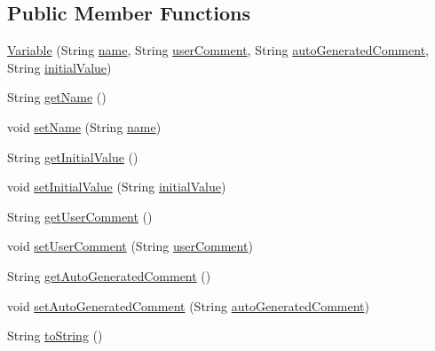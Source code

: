 \subsection*{Public Member Functions}
\begin{DoxyCompactItemize}
\item 
\hyperlink{classit_1_1isislab_1_1masonassisteddocumentation_1_1_o_d_d_1_1_variable_a9da139c1c60ec15079b4d66403f1baf9}{Variable} (String \hyperlink{classit_1_1isislab_1_1masonassisteddocumentation_1_1_o_d_d_1_1_variable_ac9b7d43d71c2021e449fa8013ba8254b}{name}, String \hyperlink{classit_1_1isislab_1_1masonassisteddocumentation_1_1_o_d_d_1_1_variable_a884cf9e8bd7fc7fca3391d3f4954e483}{user\-Comment}, String \hyperlink{classit_1_1isislab_1_1masonassisteddocumentation_1_1_o_d_d_1_1_variable_a8d4c06905b054fc8ece5f5af52dfdc24}{auto\-Generated\-Comment}, String \hyperlink{classit_1_1isislab_1_1masonassisteddocumentation_1_1_o_d_d_1_1_variable_a3113358fdb645ecec970e6c48d7a5aed}{initial\-Value})
\item 
String \hyperlink{classit_1_1isislab_1_1masonassisteddocumentation_1_1_o_d_d_1_1_variable_ac04000468ff9d61800c28d244715912d}{get\-Name} ()
\item 
void \hyperlink{classit_1_1isislab_1_1masonassisteddocumentation_1_1_o_d_d_1_1_variable_a393c8cc27858862db285c9172561770e}{set\-Name} (String \hyperlink{classit_1_1isislab_1_1masonassisteddocumentation_1_1_o_d_d_1_1_variable_ac9b7d43d71c2021e449fa8013ba8254b}{name})
\item 
String \hyperlink{classit_1_1isislab_1_1masonassisteddocumentation_1_1_o_d_d_1_1_variable_ab4b2f567957bc12e3e1e0944e4f6c1a5}{get\-Initial\-Value} ()
\item 
void \hyperlink{classit_1_1isislab_1_1masonassisteddocumentation_1_1_o_d_d_1_1_variable_aa39e818f2c271b5f6f9564ba321c9fa9}{set\-Initial\-Value} (String \hyperlink{classit_1_1isislab_1_1masonassisteddocumentation_1_1_o_d_d_1_1_variable_a3113358fdb645ecec970e6c48d7a5aed}{initial\-Value})
\item 
String \hyperlink{classit_1_1isislab_1_1masonassisteddocumentation_1_1_o_d_d_1_1_variable_ad028e857e7813b75015f54891370a01c}{get\-User\-Comment} ()
\item 
void \hyperlink{classit_1_1isislab_1_1masonassisteddocumentation_1_1_o_d_d_1_1_variable_a5deb22863e3e552f8d691d98c8280ca6}{set\-User\-Comment} (String \hyperlink{classit_1_1isislab_1_1masonassisteddocumentation_1_1_o_d_d_1_1_variable_a884cf9e8bd7fc7fca3391d3f4954e483}{user\-Comment})
\item 
String \hyperlink{classit_1_1isislab_1_1masonassisteddocumentation_1_1_o_d_d_1_1_variable_a20c85a1a667f283c385335809c15baec}{get\-Auto\-Generated\-Comment} ()
\item 
void \hyperlink{classit_1_1isislab_1_1masonassisteddocumentation_1_1_o_d_d_1_1_variable_aab621dc086e40fb51f1c68211db9d03f}{set\-Auto\-Generated\-Comment} (String \hyperlink{classit_1_1isislab_1_1masonassisteddocumentation_1_1_o_d_d_1_1_variable_a8d4c06905b054fc8ece5f5af52dfdc24}{auto\-Generated\-Comment})
\item 
String \hyperlink{classit_1_1isislab_1_1masonassisteddocumentation_1_1_o_d_d_1_1_variable_a58a8e1696ae78b11da2ad5a9c729ea82}{to\-String} ()
\end{DoxyCompactItemize}
